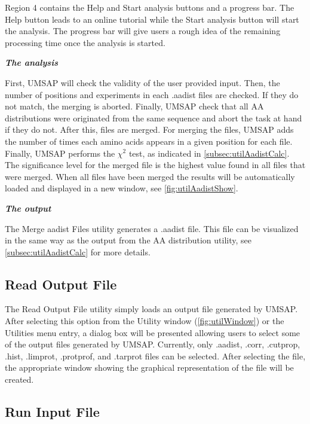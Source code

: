 Region \num{4} contains the Help and Start analysis buttons and a progress bar. The Help button leads to an online tutorial while the Start analysis button will start the analysis. The progress bar will give users a rough idea of the remaining processing time once the analysis is started.

\textit{\textbf{The analysis}}

First, UMSAP will check the validity of the user provided input. Then, the number of positions and experiments in each .aadist files are checked. If they do not match, the merging is aborted. Finally, UMSAP check that all AA distributions were originated from the same sequence and abort the task at hand if they do not. After this, files are merged. For merging the files, UMSAP adds the number of times each amino acids appears in a given position for each file. Finally, UMSAP performs the $\chi^2$ test, as indicated in \autoref{subsec:utilAadistCalc}. The significance level for the merged file is the highest value found in all files that were merged. When all files have been merged the results will be automatically loaded and displayed in a new window, see \autoref{fig:utilAadistShow}. 

\textit{\textbf{The output}} 

The Merge aadist Files utility generates a .aadist file. This file can be visualized in the same way as the output from the AA distribution utility, see \autoref{subsec:utilAadistCalc} for more details.

\subsection{Read Output File}
\label{subsec:utilReadOutF}

The Read Output File utility simply loads an output file generated by UMSAP. After selecting this option from the Utility window (\autoref{fig:utilWindow}) or the Utilities menu entry, a dialog box will be presented allowing users to select some of the output files generated by UMSAP. Currently, only .aadist, .corr, .cutprop, .hist, .limprot, .protprof, and .tarprot files can be selected. After selecting the file, the appropriate window showing the graphical representation of the file will be created. 

\subsection{Run Input File}
\label{subsec:utilReadUscr}

